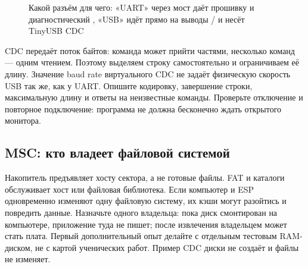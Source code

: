 \begin{figure}[H]
\centering
{}
\caption{Какой разъём для чего: «UART» через мост даёт прошивку и диагностический ,
«USB» идёт прямо на выводы / и несёт TinyUSB CDC}
\end{figure}


CDC передаёт поток байтов: команда может прийти частями, несколько команд --- одним чтением.
Поэтому выделяем строку самостоятельно и ограничиваем её длину. Значение baud rate виртуального
CDC не задаёт физическую скорость USB так же, как у UART. Опишите кодировку, завершение строки,
максимальную длину и ответы на неизвестные команды. Проверьте отключение и повторное подключение:
программа не должна бесконечно ждать открытого монитора.

\subsection{MSC: кто владеет файловой системой}
Накопитель предъявляет хосту сектора, а не готовые файлы. FAT и каталоги обслуживает хост
или файловая библиотека. Если компьютер и ESP одновременно изменяют одну файловую систему,
их кэши могут разойтись и повредить данные. Назначьте одного владельца: пока диск смонтирован
на компьютере, приложение туда не пишет; после извлечения владельцем может стать плата.
Первый дополнительный опыт делайте с отдельным тестовым RAM-диском, не с картой ученических работ.
Пример CDC диски не создаёт и файлы не изменяет.

